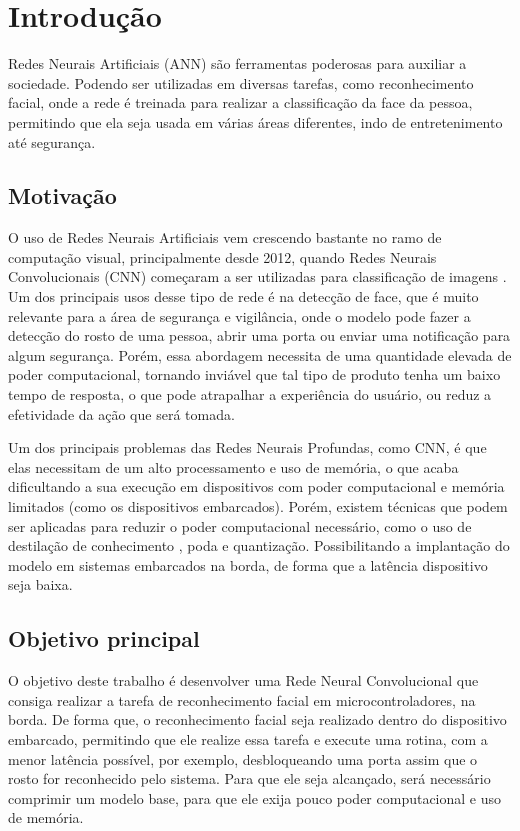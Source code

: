 \chapter{Introdução}

Redes Neurais Artificiais (ANN) são ferramentas poderosas para auxiliar a sociedade.
Podendo ser utilizadas em diversas tarefas, como reconhecimento facial, onde a rede é treinada para realizar a
classificação da face da pessoa, permitindo que ela seja usada em várias áreas diferentes, indo de entretenimento até
segurança.

\section{Motivação}
O uso de Redes Neurais Artificiais vem crescendo bastante no ramo de computação visual, principalmente desde 2012,
quando Redes Neurais Convolucionais (CNN) começaram a ser utilizadas para classificação de imagens \cite{alexnet}.
Um dos principais usos desse tipo de rede é na detecção de face, que é muito relevante para a área de segurança e
vigilância, onde o modelo pode fazer a detecção do rosto de uma pessoa, abrir uma porta ou enviar uma notificação
para algum segurança. Porém, essa abordagem necessita de uma quantidade elevada de poder computacional, tornando
inviável que tal tipo de produto tenha um baixo tempo de resposta, o que pode atrapalhar a experiência do usuário, ou
reduz a efetividade da ação que será tomada.

Um dos principais problemas das Redes Neurais Profundas, como CNN, é que elas necessitam de um alto processamento e uso
de memória, o que acaba dificultando a sua execução em dispositivos com poder computacional e memória limitados (como os dispositivos embarcados).
Porém, existem técnicas que podem ser aplicadas para reduzir o poder computacional necessário, como o uso de
destilação de conhecimento \cite{hinton2015distilling}, poda e quantização.
Possibilitando a implantação do modelo em sistemas embarcados na borda, de forma que a latência dispositivo seja baixa.

\section{Objetivo principal}

O objetivo deste trabalho é desenvolver uma Rede Neural Convolucional que consiga realizar a tarefa de reconhecimento
facial em microcontroladores, na borda.
De forma que, o reconhecimento facial seja realizado dentro do dispositivo embarcado, permitindo que ele realize essa
tarefa e execute uma rotina, com a menor latência possível, por exemplo, desbloqueando uma porta assim que o rosto for
reconhecido pelo sistema.
Para que ele seja alcançado, será necessário comprimir um modelo base, para que ele exija pouco poder computacional
e uso de memória.


